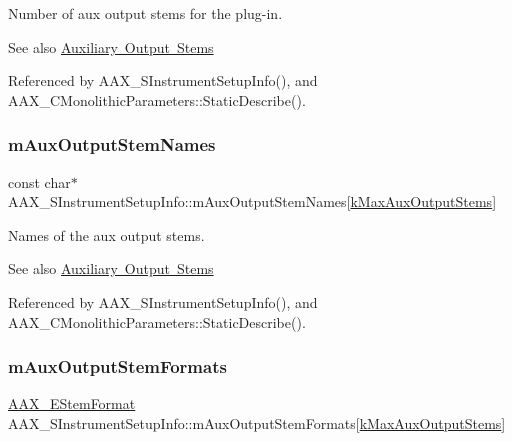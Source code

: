 Number of aux output stems for the plug-\/in. 

\begin{DoxySeeAlso}{See also}
\mbox{\hyperlink{a00809}{Auxiliary Output Stems}} 
\end{DoxySeeAlso}


Referenced by A\+A\+X\+\_\+\+S\+Instrument\+Setup\+Info(), and A\+A\+X\+\_\+\+C\+Monolithic\+Parameters\+::\+Static\+Describe().

\mbox{\label{a01957_a407f17bca3271cc84f0b85eefb0370cd}} 
\subsubsection{\texorpdfstring{mAuxOutputStemNames}{mAuxOutputStemNames}}
{\footnotesize\ttfamily const char$\ast$ A\+A\+X\+\_\+\+S\+Instrument\+Setup\+Info\+::m\+Aux\+Output\+Stem\+Names\mbox{[}\mbox{\hyperlink{a00746_a3ce9db1fba97512379a8715f9cb166e4}{k\+Max\+Aux\+Output\+Stems}}\mbox{]}}



Names of the aux output stems. 

\begin{DoxySeeAlso}{See also}
\mbox{\hyperlink{a00809}{Auxiliary Output Stems}} 
\end{DoxySeeAlso}


Referenced by A\+A\+X\+\_\+\+S\+Instrument\+Setup\+Info(), and A\+A\+X\+\_\+\+C\+Monolithic\+Parameters\+::\+Static\+Describe().

\mbox{\label{a01957_afd521b6b1d9b3d809e55c5c065859159}} 
\subsubsection{\texorpdfstring{mAuxOutputStemFormats}{mAuxOutputStemFormats}}
{\footnotesize\ttfamily \mbox{\hyperlink{a00491_ad8af5ef008b2bd478add9a0acb0a1d85}{A\+A\+X\+\_\+\+E\+Stem\+Format}} A\+A\+X\+\_\+\+S\+Instrument\+Setup\+Info\+::m\+Aux\+Output\+Stem\+Formats\mbox{[}\mbox{\hyperlink{a00746_a3ce9db1fba97512379a8715f9cb166e4}{k\+Max\+Aux\+Output\+Stems}}\mbox{]}}



